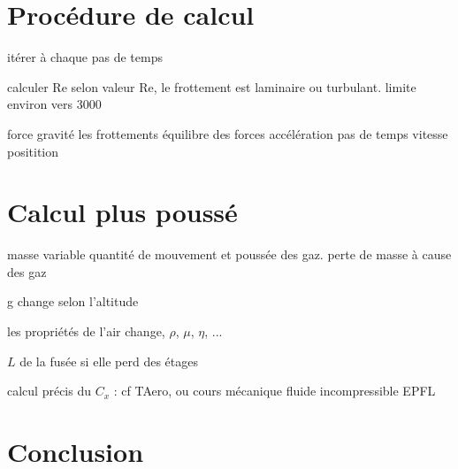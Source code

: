 \documentclass[12pt,a4paper]{article}
\begin{document}
\section{Procédure de calcul}

itérer à chaque pas de temps

calculer Re
selon valeur Re, le frottement est laminaire ou turbulant. limite environ vers 3000

force gravité
les frottements
équilibre des forces
accélération
pas de temps
vitesse 
positition

\section{Calcul plus poussé}
masse variable
quantité de mouvement et poussée des gaz. perte de masse à cause des gaz

g change selon l'altitude

les propriétés de l'air change, $\rho$, $\mu$, $\eta$, ...

$L$ de la fusée si elle perd des étages

calcul précis du $C_x$ : cf TAero, ou cours mécanique fluide incompressible EPFL
\section{Conclusion}
\end{document}
